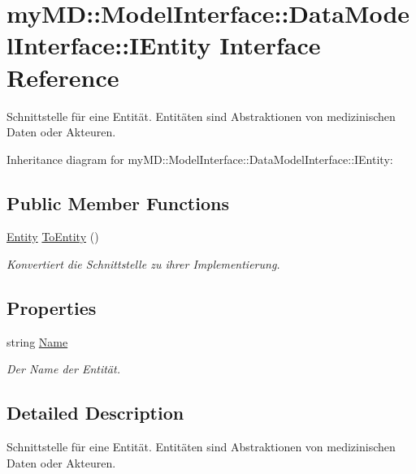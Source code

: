 \hypertarget{interfacemy_m_d_1_1_model_interface_1_1_data_model_interface_1_1_i_entity}{
\section{my\-MD::Model\-Interface::Data\-Model\-Interface::IEntity Interface Reference}
\label{d2/d64/interfacemy_m_d_1_1_model_interface_1_1_data_model_interface_1_1_i_entity}
}
Schnittstelle f\"{u}r eine Entit\"{a}t. Entit\"{a}ten sind Abstraktionen von medizinischen Daten oder Akteuren.  


Inheritance diagram for my\-MD::Model\-Interface::Data\-Model\-Interface::IEntity:\subsection*{Public Member Functions}
\begin{CompactItemize}
\item 
\hyperlink{classmy_m_d_1_1_model_1_1_data_model_1_1_entity}{Entity} \hyperlink{interfacemy_m_d_1_1_model_interface_1_1_data_model_interface_1_1_i_entity_1a8b26c73ec083d6930f1f39ce916df3}{To\-Entity} ()
\begin{CompactList}\small\item\em Konvertiert die Schnittstelle zu ihrer Implementierung. \item\end{CompactList}\end{CompactItemize}
\subsection*{Properties}
\begin{CompactItemize}
\item 
string \hyperlink{interfacemy_m_d_1_1_model_interface_1_1_data_model_interface_1_1_i_entity_49ee3087348e8d44e1feda1917443987}{Name}
\begin{CompactList}\small\item\em Der Name der Entit\"{a}t. \item\end{CompactList}\end{CompactItemize}


\subsection{Detailed Description}
Schnittstelle f\"{u}r eine Entit\"{a}t. Entit\"{a}ten sind Abstraktionen von medizinischen Daten oder Akteuren. 



